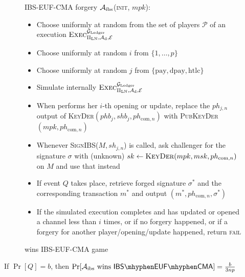   \begin{figure}[H]
    \begin{algobox}{\textsf{IBS-EUF-CMA} forgery}
      $\mathcal{A}_{\mathrm{ibs}}$(\textsc{init}, $mpk$):
      \begin{itemize}
        \item Choose uniformly at random \alice{} from the set of players
        $\mathcal{P}$ of an execution
        $\textsc{Exec}^{\mathcal{G}_{\mathrm{Ledger}}}_{\Pi_{\mathrm{LN}}, \mathcal{A}_{\mathrm{d}},
        \mathcal{E}}$
        \item Choose uniformly at random $i$ from $\{1, \dots, p\}$
        \item Choose uniformly at random $j$ from $\{\mathrm{pay},
        \mathrm{dpay}, \mathrm{htlc}\}$
        \item Simulate internally
        $\textsc{Exec}^{\mathcal{G}_{\mathrm{Ledger}}}_{\Pi_{\mathrm{LN}}, \mathcal{A}_{\mathrm{d}},
        \mathcal{E}}$
        \item When \alice{} performs her $i$-th opening or update, replace the
        $ph_{j, n}$ output of \textsc{KeyDer}$(phb_j, shb_j, ph_{\mathrm{com},
        n})$ with \textsc{PubKeyDer}$(mpk, ph_{\mathrm{com}, n})$
        \item Whenever \textsc{SignIBS}($M, sh_{j, n}$) is called, ask
        challenger for the signature $\sigma$ with (unknown) $sk \gets
        \textsc{KeyDer}(mpk, msk, ph_{\mathrm{com}, n})$ on $M$ and use that
        instead
        \item If event $Q$ takes place, retrieve forged signature $\sigma^*$ and
        the corresponding transaction $m^*$ and output $(m^*, ph_{\mathrm{com},
        n},\sigma^*)$
        \item If the simulated execution completes and \alice{} has updated or
        opened a channel less than $i$ times, or if no forgery happened, or if a
        forgery for another player/opening/update happened, return \textsc{fail}
      \end{itemize}
    \end{algobox}
    \caption{wins \textsf{IBS-EUF-CMA} game}
    \label{alg:forge:ibs}
  \end{figure}

  \begin{proposition}
  \label{prop:forgery:ibs}
    If $\Pr[Q] = b$, then $\Pr[\adversary_{\mathrm{ibs}} \text{ wins }
    \mathsf{IBS \mhyphen EUF \mhyphen CMA}] = \frac{b}{3np}$
  \end{proposition}

